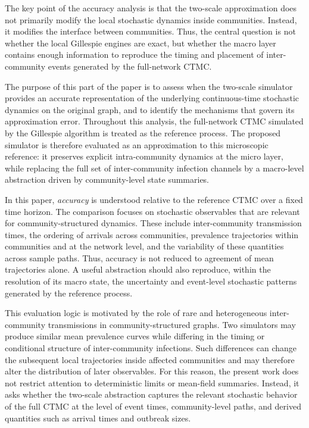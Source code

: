 \documentclass[12pt,a4paper]{article}
\begin{document}
The key point of the accuracy analysis is that the two-scale approximation does not primarily modify the local stochastic dynamics inside communities. 
Instead, it modifies the interface between communities. 
Thus, the central question is not whether the local Gillespie engines are exact, but whether the macro layer contains enough information to reproduce the timing and placement of inter-community events generated by the full-network CTMC.

The purpose of this part of the paper is to assess when the two-scale simulator provides an accurate representation of the underlying continuous-time stochastic dynamics on the original graph, and to identify the mechanisms that govern its approximation error. Throughout this analysis, the full-network CTMC simulated by the Gillespie algorithm is treated as the reference process. The proposed simulator is therefore evaluated as an approximation to this microscopic reference: it preserves explicit intra-community dynamics at the micro layer, while replacing the full set of inter-community infection channels by a macro-level abstraction driven by community-level state summaries.

In this paper, \emph{accuracy} is understood relative to the reference CTMC over a fixed time horizon. The comparison focuses on stochastic observables that are relevant for community-structured dynamics. These include inter-community transmission times, the ordering of arrivals across communities, prevalence trajectories within communities and at the network level, and the variability of these quantities across sample paths. Thus, accuracy is not reduced to agreement of mean trajectories alone. A useful abstraction should also reproduce, within the resolution of its macro state, the uncertainty and event-level stochastic patterns generated by the reference process.

This evaluation logic is motivated by the role of rare and heterogeneous inter-community transmissions in community-structured graphs. Two simulators may produce similar mean prevalence curves while differing in the timing or conditional structure of inter-community infections. Such differences can change the subsequent local trajectories inside affected communities and may therefore alter the distribution of later observables. For this reason, the present work does not restrict attention to deterministic limits or mean-field summaries. Instead, it asks whether the two-scale abstraction captures the relevant stochastic behavior of the full CTMC at the level of event times, community-level paths, and derived quantities such as arrival times and outbreak sizes.
\end{document}
